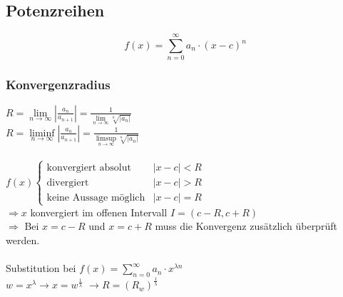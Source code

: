 \documentclass[6pt,a4paper]{scrartcl}
\newcommand{\abs}[1]{\ensuremath{\left\vert#1\right\vert}}
\newcommand{\Ra}[0]{\ensuremath{\Rightarrow}}
\begin{document}
\begin{multicols*}{4}
\subsection{Potenzreihen} %
\begin{equation*}
f(x)=\sum_{n=0}^\infty a_n \cdot (x-c)^n
\end{equation*}
\subsubsection{Konvergenzradius}
$R = \lim\limits_{n\rightarrow \infty} \abs{\frac{a_n}{a_{n+1}}}=\frac{1}{\lim\limits_{n\rightarrow \infty}\sqrt[n]{\abs{a_n}}}$ \\
$R =\liminf\limits_{n\rightarrow \infty} \abs{\frac{a_n}{a_{n+1}}}=\frac{1}{\limsup\limits_{n\rightarrow \infty}\sqrt[n]{\abs{a_n}}}$ \\ \\
$f(x)\begin{cases} 
	\text{konvergiert absolut} & \abs{x-c} < R \\
	\text{divergiert} & \abs{x-c} > R \\
	\text{keine Aussage möglich} & \abs{x-c} = R
	\end{cases}$\\
$\Ra x$ konvergiert im offenen Intervall $I=(c-R,c+R)$ \\
$\Ra$ Bei $x=c-R$ und $x=c+R$ muss die Konvergenz zusätzlich überprüft werden.\\\\
Substitution bei $f(x)=\sum_{n=0}^\infty a_n \cdot x^{\lambda n}$ \\
$w=x^\lambda \rightarrow x=w^\frac{1}{\lambda}$
$\rightarrow R=\left(R_w\right)^\frac{1}{\lambda}$


\end{multicols*}
\end{document}
